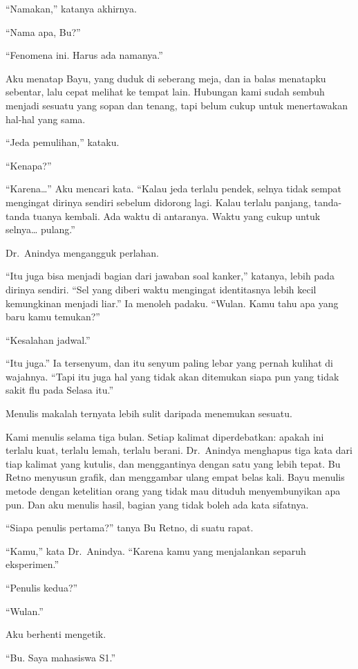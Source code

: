 \documentclass[11pt,twoside,openany]{book}
\makeatletter
\newcommand{\scenebreak}{\par\vspace{0.9em}{\centering\textsc{*\hspace{0.7em}*\hspace{0.7em}*}\par}\vspace{0.9em}\@afterindentfalse\@afterheading}
\makeatother
\begin{document}
``Namakan,'' katanya akhirnya.

``Nama apa, Bu?''

``Fenomena ini. Harus ada namanya.''

Aku menatap Bayu, yang duduk di seberang meja, dan ia balas menatapku sebentar, lalu cepat melihat ke tempat lain. Hubungan kami sudah sembuh menjadi sesuatu yang sopan dan tenang, tapi belum cukup untuk menertawakan hal-hal yang sama.

``Jeda pemulihan,'' kataku.

``Kenapa?''

``Karena\ldots{}'' Aku mencari kata. ``Kalau jeda terlalu pendek, selnya tidak sempat mengingat dirinya sendiri sebelum didorong lagi. Kalau terlalu panjang, tanda-tanda tuanya kembali. Ada waktu di antaranya. Waktu yang cukup untuk selnya\ldots{} pulang.''

Dr.~Anindya mengangguk perlahan.

``Itu juga bisa menjadi bagian dari jawaban soal kanker,'' katanya, lebih pada dirinya sendiri. ``Sel yang diberi waktu mengingat identitasnya lebih kecil kemungkinan menjadi liar.'' Ia menoleh padaku. ``Wulan. Kamu tahu apa yang baru kamu temukan?''

``Kesalahan jadwal.''

``Itu juga.'' Ia tersenyum, dan itu senyum paling lebar yang pernah kulihat di wajahnya. ``Tapi itu juga hal yang tidak akan ditemukan siapa pun yang tidak sakit flu pada Selasa itu.''

\scenebreak
Menulis makalah ternyata lebih sulit daripada menemukan sesuatu.

Kami menulis selama tiga bulan. Setiap kalimat diperdebatkan: apakah ini terlalu kuat, terlalu lemah, terlalu berani. Dr.~Anindya menghapus tiga kata dari tiap kalimat yang kutulis, dan menggantinya dengan satu yang lebih tepat. Bu Retno menyusun grafik, dan menggambar ulang empat belas kali. Bayu menulis metode dengan ketelitian orang yang tidak mau dituduh menyembunyikan apa pun. Dan aku menulis hasil, bagian yang tidak boleh ada kata sifatnya.

``Siapa penulis pertama?'' tanya Bu Retno, di suatu rapat.

``Kamu,'' kata Dr.~Anindya. ``Karena kamu yang menjalankan separuh eksperimen.''

``Penulis kedua?''

``Wulan.''

Aku berhenti mengetik.

``Bu. Saya mahasiswa S1.''
\end{document}
